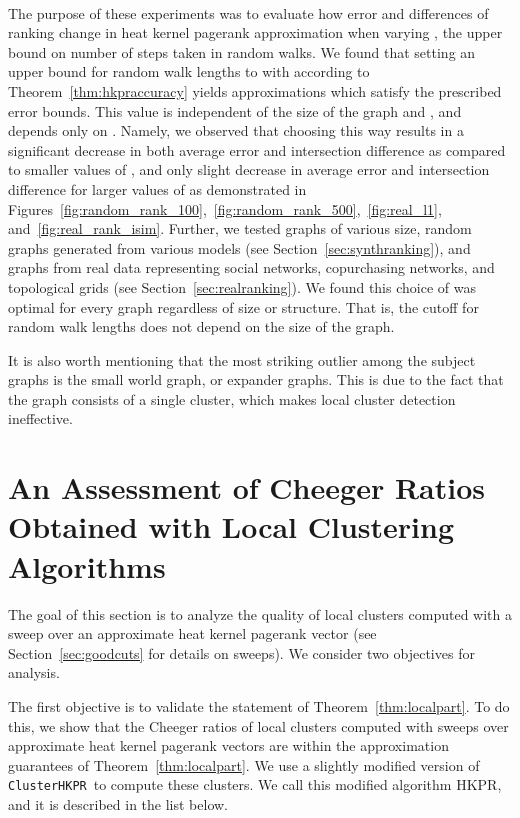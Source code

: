 \documentclass[runningheads,a4paper]{llncs}
\newcommand{\partitionalg}{\texttt{ClusterHKPR}}
\begin{document}
\paragraph{}The purpose of these experiments was to evaluate how error and differences of
ranking change in heat kernel pagerank approximation when varying , the upper
bound on number of steps taken in random walks.  We found that setting an upper
bound for random walk lengths to  with 
according to Theorem~\ref{thm:hkpraccuracy} yields approximations which satisfy
the prescribed error bounds.  This value is independent of the size of the graph
and , and depends only on .  Namely, we observed that choosing 
this way results in a significant decrease in both average  error and
intersection difference as compared to smaller values of , and only slight
decrease in average  error and intersection difference for larger values of
 as demonstrated in
Figures~\ref{fig:random_rank_100},~\ref{fig:random_rank_500},~\ref{fig:real_l1},
and~\ref{fig:real_rank_isim}.  Further, we tested graphs of various size, random
graphs generated from various models (see Section~\ref{sec:synthranking}), and
graphs from real data representing social networks, copurchasing networks, and
topological grids (see Section~\ref{sec:realranking}).  We found this choice of
 was optimal for every graph regardless of size or structure.  That is, the
cutoff for random walk lengths does not depend on the size of the graph.

It is also worth mentioning that the most striking outlier among the subject
graphs is the small world graph, or expander graphs.  This is due to the fact
that the graph consists of a single cluster, which makes local cluster detection
ineffective.

\section{An Assessment of Cheeger Ratios Obtained with Local Clustering Algorithms}
\label{sec:expresults}
The goal of this section is to analyze the quality of local clusters computed
with a sweep over an approximate heat kernel pagerank vector (see
Section~\ref{sec:goodcuts} for details on sweeps).  We consider two objectives
for analysis.

The first objective is to validate the statement of Theorem~\ref{thm:localpart}.
To do this, we show that the Cheeger ratios of local clusters computed with
sweeps over approximate heat kernel pagerank vectors are within the
approximation guarantees of Theorem~\ref{thm:localpart}.  We use a slightly
modified version of \partitionalg~to compute these clusters.  We call this
modified algorithm HKPR, and it is described in the list below.  
\end{document}
